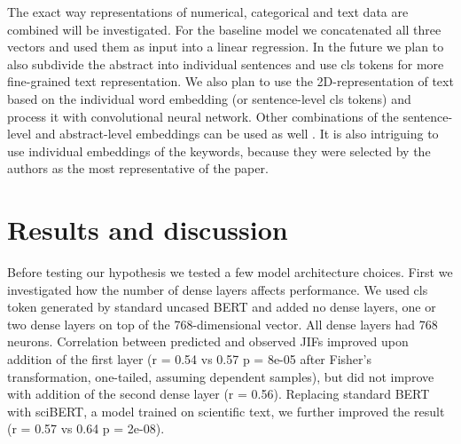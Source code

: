 \documentclass[11pt]{article}
\begin{document}
The exact way representations of numerical, categorical and text data are combined will be investigated. For the baseline model we concatenated all three vectors and used them as input into a linear regression. In the future we plan to also subdivide the abstract into individual sentences and use cls tokens for more fine-grained text representation. We also plan to use the 2D-representation of text based on the individual word embedding (or sentence-level cls tokens) and process it with convolutional  neural network. Other combinations of the sentence-level and abstract-level embeddings can be used as well \citep{hs2022}. It is also intriguing to use individual embeddings of the keywords, because they were selected by the authors as the most representative of the paper.

\section{Results and discussion}
Before testing our hypothesis we tested a few model architecture choices. First we investigated how the number of dense layers affects performance. We used cls token generated by standard uncased BERT and added no dense layers, one or two dense layers on top of the 768-dimensional vector. All dense layers had 768 neurons. Correlation between predicted and observed JIFs improved upon addition of the first layer (r = 0.54 vs 0.57 p = 8e-05 after Fisher's transformation, one-tailed, assuming dependent samples), but did not improve with addition of the second dense layer (r = 0.56). Replacing standard BERT with sciBERT, a model trained on scientific text, we further improved the result (r = 0.57 vs 0.64 p = 2e-08). 
\end{document}
